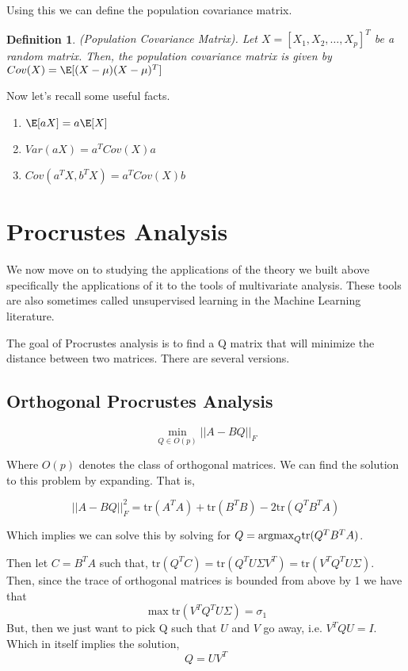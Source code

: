\documentclass[twoside]{article}
\newcommand\tr[1]{\text{tr}#1}
\newcommand\argmax[1]{\text{argmax}#1}
\newtheorem{definition}[theorem]{Definition}
\begin{document}
Using this we can define the population covariance matrix. 

\begin{definition}(Population Covariance Matrix).
Let $X = [X_1,X_2,\dots,X_p]^T$ be a random matrix. Then, the population covariance matrix is given by $Cov(X) = \E[(X-\mu)(X-\mu)^T]$

\end{definition}

Now let's recall some useful facts.

\begin{enumerate}
\item $\E[aX]=a\E[X]$
\item $Var(aX) = a^TCov(X)a$
\item $Cov(a^TX, b^TX) = a^TCov(X)b$
\end{enumerate}


\section{Procrustes Analysis}

We now move on to studying the applications of the theory we built above specifically the applications of it to the tools of multivariate analysis. These tools are also sometimes called unsupervised learning in the Machine Learning literature.

The goal of Procrustes analysis is to find a Q matrix that will minimize the distance between two matrices. There are several versions.

\subsection{Orthogonal Procrustes Analysis}

\begin{equation}
\min_{Q\in O(p)} ||A-BQ||_F
\end{equation} 

Where $O(p)$ denotes the class of orthogonal matrices. We can find the solution to this problem by expanding. That is,

$$||A-BQ||_F^2 = \tr(A^TA) + \tr(B^TB)-2\tr(Q^TB^TA) $$ 

Which implies we can solve this by solving for $Q = \argmax_Q \tr(Q^TB^TA)$.

Then let $C = B^TA$ such that, $\tr(Q^TC) = \tr(Q^TU\Sigma V^T)=\tr(V^TQ^TU\Sigma)$. Then, since the trace of orthogonal matrices is bounded from above by 1 we have that 
$$\max \tr(V^TQ^TU\Sigma ) = \sigma_{1}$$
But, then we just want to pick Q such that $U$ and $V$ go away, i.e. $V^TQU = I$. Which in itself implies the solution,
\begin{equation}
Q = UV^T
\end{equation}
\end{document}
